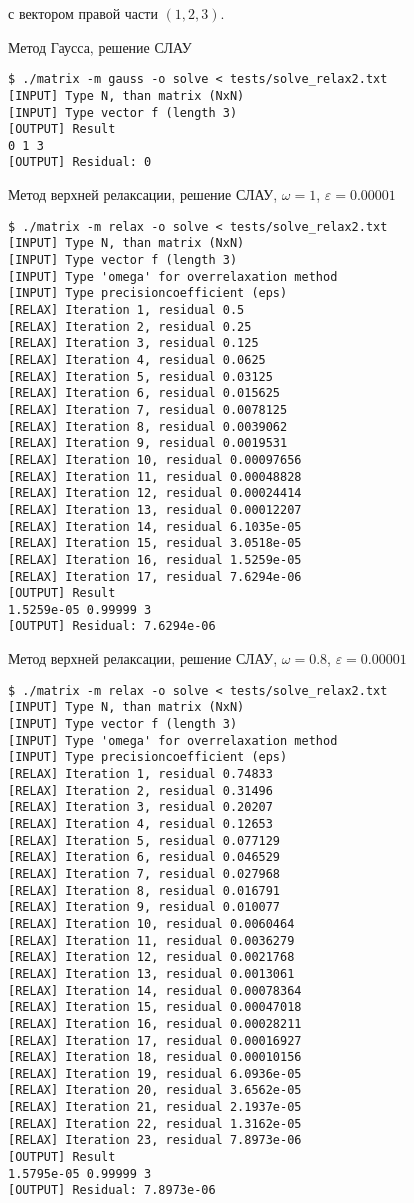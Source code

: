 \documentclass[a4paper,11pt]{report}
\begin{document}
с вектором правой части $(1, 2, 3)$.

\begin{bash}
\caption{Метод Гаусса, решение СЛАУ}
\begin{verbatim}
$ ./matrix -m gauss -o solve < tests/solve_relax2.txt 
[INPUT] Type N, than matrix (NxN)
[INPUT] Type vector f (length 3)
[OUTPUT] Result
0 1 3 
[OUTPUT] Residual: 0
\end{verbatim}
\end{bash}


\begin{bash}
\caption{Метод верхней релаксации, решение СЛАУ, $\omega = 1$, $\varepsilon = 0.00001$}
\begin{verbatim}
$ ./matrix -m relax -o solve < tests/solve_relax2.txt 
[INPUT] Type N, than matrix (NxN)
[INPUT] Type vector f (length 3)
[INPUT] Type 'omega' for overrelaxation method
[INPUT] Type precisioncoefficient (eps)
[RELAX] Iteration 1, residual 0.5
[RELAX] Iteration 2, residual 0.25
[RELAX] Iteration 3, residual 0.125
[RELAX] Iteration 4, residual 0.0625
[RELAX] Iteration 5, residual 0.03125
[RELAX] Iteration 6, residual 0.015625
[RELAX] Iteration 7, residual 0.0078125
[RELAX] Iteration 8, residual 0.0039062
[RELAX] Iteration 9, residual 0.0019531
[RELAX] Iteration 10, residual 0.00097656
[RELAX] Iteration 11, residual 0.00048828
[RELAX] Iteration 12, residual 0.00024414
[RELAX] Iteration 13, residual 0.00012207
[RELAX] Iteration 14, residual 6.1035e-05
[RELAX] Iteration 15, residual 3.0518e-05
[RELAX] Iteration 16, residual 1.5259e-05
[RELAX] Iteration 17, residual 7.6294e-06
[OUTPUT] Result
1.5259e-05 0.99999 3 
[OUTPUT] Residual: 7.6294e-06
\end{verbatim}
\end{bash}

\begin{bash}
\caption{Метод верхней релаксации, решение СЛАУ, $\omega = 0.8$, $\varepsilon = 0.00001$}
\begin{verbatim}
$ ./matrix -m relax -o solve < tests/solve_relax2.txt 
[INPUT] Type N, than matrix (NxN)
[INPUT] Type vector f (length 3)
[INPUT] Type 'omega' for overrelaxation method
[INPUT] Type precisioncoefficient (eps)
[RELAX] Iteration 1, residual 0.74833
[RELAX] Iteration 2, residual 0.31496
[RELAX] Iteration 3, residual 0.20207
[RELAX] Iteration 4, residual 0.12653
[RELAX] Iteration 5, residual 0.077129
[RELAX] Iteration 6, residual 0.046529
[RELAX] Iteration 7, residual 0.027968
[RELAX] Iteration 8, residual 0.016791
[RELAX] Iteration 9, residual 0.010077
[RELAX] Iteration 10, residual 0.0060464
[RELAX] Iteration 11, residual 0.0036279
[RELAX] Iteration 12, residual 0.0021768
[RELAX] Iteration 13, residual 0.0013061
[RELAX] Iteration 14, residual 0.00078364
[RELAX] Iteration 15, residual 0.00047018
[RELAX] Iteration 16, residual 0.00028211
[RELAX] Iteration 17, residual 0.00016927
[RELAX] Iteration 18, residual 0.00010156
[RELAX] Iteration 19, residual 6.0936e-05
[RELAX] Iteration 20, residual 3.6562e-05
[RELAX] Iteration 21, residual 2.1937e-05
[RELAX] Iteration 22, residual 1.3162e-05
[RELAX] Iteration 23, residual 7.8973e-06
[OUTPUT] Result
1.5795e-05 0.99999 3 
[OUTPUT] Residual: 7.8973e-06
\end{verbatim}
\end{bash}
\end{document}
